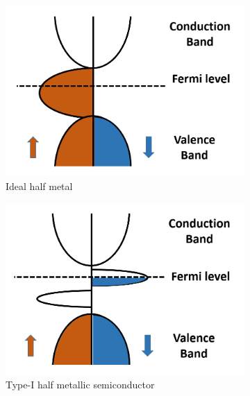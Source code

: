 \documentclass[main.tex]{subfiles}
\begin{document}
\begin{figure}[!htb]
\begin{subfigure}[h]{0.32\textwidth}
  		\centering
  		\includegraphics[width=\linewidth]{dos_half_metal}
  		\caption{Ideal half metal}
  		\label{fig:sub-second}
	\end{subfigure}
	\begin{subfigure}[h]{0.32\textwidth}
  		\centering
  		\includegraphics[width=\linewidth]{dos_half_metallic1}
  		\caption{Type-I half metallic semiconductor}
  		\label{fig:sub-second}
	\end{subfigure}
	\begin{subfigure}[h]{0.32\textwidth}
  		\centering

\end{subfigure}
\end{figure}
\end{document}
